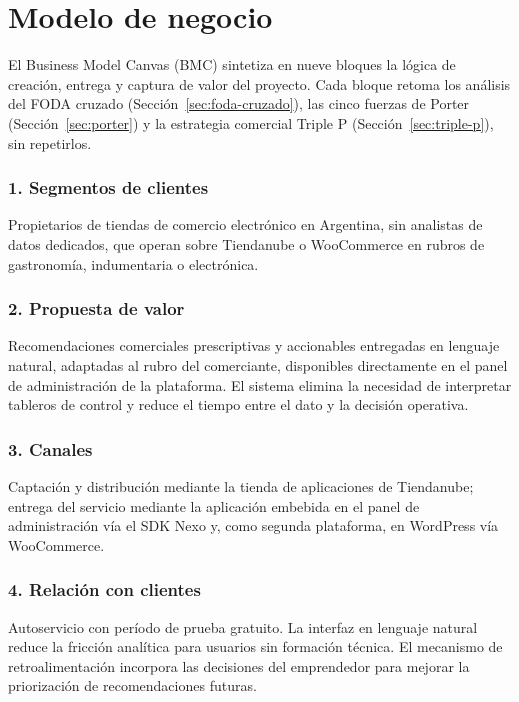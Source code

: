 \section{Modelo de negocio}
\label{sec:modelo-negocio}

El Business Model Canvas (BMC) sintetiza en nueve bloques la lógica de creación, entrega y captura de valor del proyecto. Cada bloque retoma los análisis del FODA cruzado (Sección~\ref{sec:foda-cruzado}), las cinco fuerzas de Porter (Sección~\ref{sec:porter}) y la estrategia comercial Triple P (Sección~\ref{sec:triple-p}), sin repetirlos.

\subsubsection*{1. Segmentos de clientes}

Propietarios de tiendas de comercio electrónico en Argentina, sin analistas de datos dedicados, que operan sobre Tiendanube o WooCommerce en rubros de gastronomía, indumentaria o electrónica.

\subsubsection*{2. Propuesta de valor}

Recomendaciones comerciales prescriptivas y accionables entregadas en lenguaje natural, adaptadas al rubro del comerciante, disponibles directamente en el panel de administración de la plataforma. El sistema elimina la necesidad de interpretar tableros de control y reduce el tiempo entre el dato y la decisión operativa.

\subsubsection*{3. Canales}

Captación y distribución mediante la tienda de aplicaciones de Tiendanube; entrega del servicio mediante la aplicación embebida en el panel de administración vía el SDK Nexo y, como segunda plataforma, en WordPress vía WooCommerce.

\subsubsection*{4. Relación con clientes}

Autoservicio con período de prueba gratuito. La interfaz en lenguaje natural reduce la fricción analítica para usuarios sin formación técnica. El mecanismo de retroalimentación incorpora las decisiones del emprendedor para mejorar la priorización de recomendaciones futuras.

